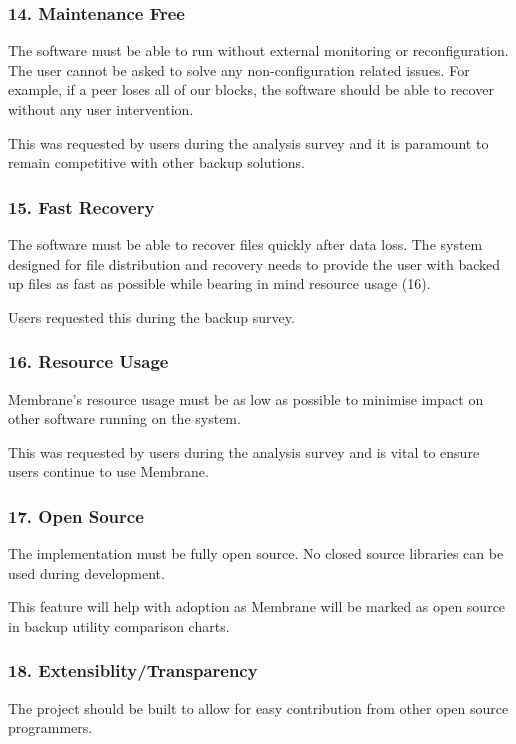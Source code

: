 \documentclass[11pt, a4paper, twoside]{report}
\begin{document}
\subsubsection{14. Maintenance Free}
The software must be able to run without external monitoring or reconfiguration. The user cannot be asked to solve any non-configuration related issues. For example, if a peer loses all of our blocks, the software should be able to recover without any user intervention.

This was requested by users during the analysis survey and it is paramount to remain competitive with other backup solutions.

\subsubsection{15. Fast Recovery}
The software must be able to recover files quickly after data loss. The system designed for file distribution and recovery needs to provide the user with backed up files as fast as possible while bearing in mind resource usage (16).

Users requested this during the backup survey.

\subsubsection{16. Resource Usage}
Membrane's resource usage must be as low as possible to minimise impact on other software running on the system.

This was requested by users during the analysis survey and is vital to ensure users continue to use Membrane.

\subsubsection{17. Open Source}

The implementation must be fully open source. No closed source libraries can be used during development.

This feature will help with adoption as Membrane will be marked as open source in backup utility comparison charts.

\subsubsection{18. Extensiblity/Transparency}

The project should be built to allow for easy contribution from other open source programmers.
\end{document}
